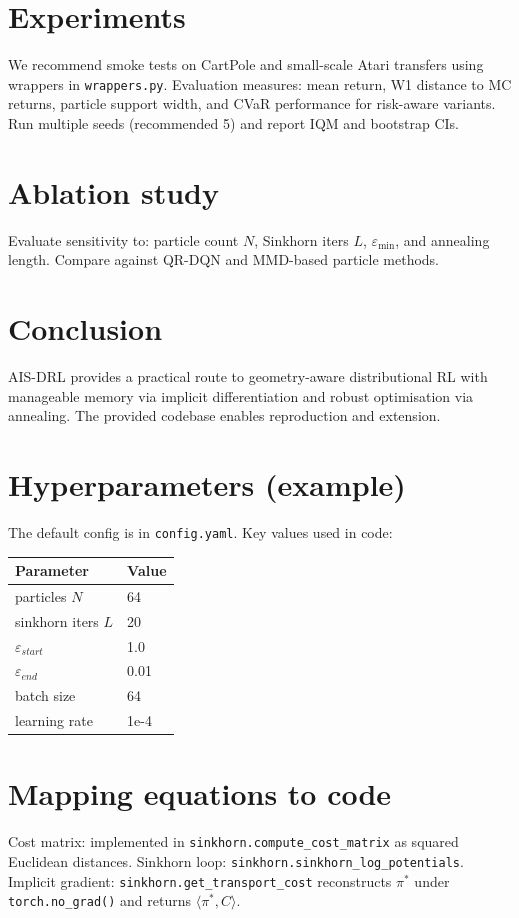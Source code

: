 \documentclass{article}
\begin{document}
\section{Experiments}
We recommend smoke tests on CartPole and small-scale Atari transfers using wrappers in \texttt{wrappers.py}. Evaluation measures: mean return, W1 distance to MC returns, particle support width, and CVaR performance for risk-aware variants. Run multiple seeds (recommended 5) and report IQM and bootstrap CIs.

\section{Ablation study}
Evaluate sensitivity to: particle count $N$, Sinkhorn iters $L$, $\varepsilon_{\min}$, and annealing length. Compare against QR-DQN and MMD-based particle methods.

\section{Conclusion}
AIS-DRL provides a practical route to geometry-aware distributional RL with manageable memory via implicit differentiation and robust optimisation via annealing. The provided codebase enables reproduction and extension.

\appendix
\section{Hyperparameters (example)}
The default config is in \texttt{config.yaml}. Key values used in code:
\begin{tabular}{ll}
\toprule
Parameter & Value \\
\midrule
particles $N$ & 64 \\
sinkhorn iters $L$ & 20 \\
$\varepsilon_{start}$ & 1.0 \\
$\varepsilon_{end}$ & 0.01 \\
batch size & 64 \\
learning rate & 1e-4 \\
\bottomrule
\end{tabular}

\section{Mapping equations to code}
Cost matrix: implemented in \texttt{sinkhorn.compute_cost_matrix} as squared Euclidean distances. Sinkhorn loop: \texttt{sinkhorn.sinkhorn_log_potentials}. Implicit gradient: \texttt{sinkhorn.get_transport_cost} reconstructs $\pi^*$ under \texttt{torch.no\_grad()} and returns $\langle\pi^*,C\rangle$.
\end{document}
